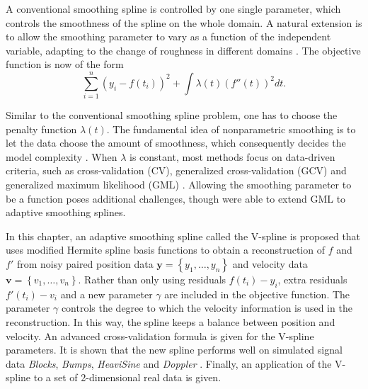 



A conventional smoothing spline is controlled by one single parameter, which controls the smoothness of the spline on the whole domain. A natural extension is to allow the smoothing parameter to vary as a function of the independent variable, adapting to the change of roughness in different domains \citep{silverman1985some, donoho1995wavelet}. The objective function is now of the form 
\begin{equation}\label{objective}
\sum_{i=1}^{n}\left(y_i-f(t_i) \right)^2+\int\lambda(t) \left( f''(t)\right)^2 dt.
\end{equation}


Similar to the conventional smoothing spline problem, one has to choose the penalty function $\lambda(t)$. The fundamental idea of nonparametric smoothing is to let the data choose the amount of smoothness, which consequently decides the model complexity \citep{gu1998model}. When $\lambda$ is constant, most methods focus on data-driven criteria, such as cross-validation (CV), generalized cross-validation (GCV) \citep{craven1978smoothing} and generalized maximum likelihood (GML) \citep{wahba1985comparison}. Allowing the smoothing parameter to be a function poses additional challenges, though \cite{liu2010data} were able to extend GML to adaptive smoothing splines.


In this chapter, an adaptive smoothing spline called the V-spline is proposed that uses modified Hermite spline basis functions to obtain a reconstruction of $f$ and $f'$ from noisy paired position data $\mathbf{y}=\left\lbrace y_1,\ldots,y_n\right\rbrace$ and velocity data $\mathbf{v}=\left\lbrace v_1,\ldots,v_n\right\rbrace$. Rather than only using residuals $f(t_i)-y_i$, extra residuals  $f'(t_i)-v_i$ and a new parameter $\gamma$ are included in the objective function. The parameter $\gamma$ controls the degree to which the velocity information is used in the reconstruction. In this way, the spline keeps a balance between position and velocity. An advanced cross-validation formula is given for the V-spline parameters. It is shown that the new spline performs well on simulated signal data \textit{Blocks}, \textit{Bumps}, \textit{HeaviSine} and \textit{Doppler} \citep{donoho1994ideal}. Finally, an application of the V-spline to a set of 2-dimensional real data is given. 

